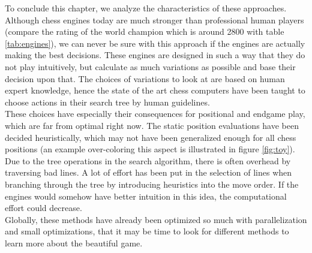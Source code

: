 To conclude this chapter, we analyze the characteristics of these approaches. Although chess engines today are much stronger than professional human players (compare the rating of the world champion which is around 2800 with table \ref{tab:engines}), we can never be sure with this approach if the engines are actually making the best decisions. These engines are designed in such a way that they do not play intuitively, but calculate as much variations as possible and base their decision upon that. The choices of variations to look at are based on human expert knowledge, hence the state of the art chess computers have been taught to choose actions in their search tree by human guidelines. \\
These choices have especially their consequences for positional and endgame play, which are far from optimal right now. The static position evaluations have been decided heuristically, which may not have been generalized enough for all chess positions (an example over-coloring this aspect is illustrated in figure \ref{fig:toy}).\\
Due to the tree operations in the search algorithm, there is often overhead by traversing bad lines. A lot of effort has been put in the selection of lines when branching through the tree by introducing heuristics into the move order. If the engines would somehow have better intuition in this idea, the computational effort could decrease.\\
Globally, these methods have already been optimized so much with parallelization and small optimizations, that it may be time to look for different methods to learn more about the beautiful game.

